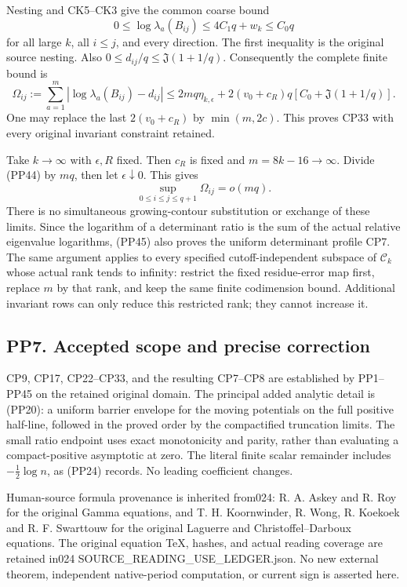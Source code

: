 \documentclass[10pt]{article}
\begin{document}
Nesting and CK5--CK3 give the common coarse bound \[
0\le\log\lambda_a(B_{ij})\le4C_1q+w_k\le C_0q
\tag{PP43}
\] for all large \(k\), all \(i\le j\), and every direction. The first inequality is the original source nesting. Also \(0\le d_{ij}/q\le\mathfrak J(1+1/q)\). Consequently the complete finite bound is \[
\boxed{
\Omega_{ij}:=\sum_{a=1}^m|\log\lambda_a(B_{ij})-d_{ij}|
\le2mq\eta_{k,\epsilon}
+2(v_0+c_R)q[C_0+\mathfrak J(1+1/q)].
}
\tag{PP44}
\] One may replace the last \(2(v_0+c_R)\) by \(\min(m,2c)\). This proves CP33 with every original invariant constraint retained.

Take \(k\to\infty\) with \(\epsilon,R\) fixed. Then \(c_R\) is fixed and \(m=8k-16\to\infty\). Divide (PP44) by \(mq\), then let \(\epsilon\downarrow0\). This gives \[
\boxed{\sup_{0\le i\le j\le q+1}\Omega_{ij}=o(mq).}
\tag{PP45}
\] There is no simultaneous growing-contour substitution or exchange of these limits. Since the logarithm of a determinant ratio is the sum of the actual relative eigenvalue logarithms, (PP45) also proves the uniform determinant profile CP7. The same argument applies to every specified cutoff-independent subspace of \(\mathcal C_k\) whose actual rank tends to infinity: restrict the fixed residue-error map first, replace \(m\) by that rank, and keep the same finite codimension bound. Additional invariant rows can only reduce this restricted rank; they cannot increase it.

\subsection{PP7. Accepted scope and precise correction}\label{pp7.-accepted-scope-and-precise-correction}

CP9, CP17, CP22--CP33, and the resulting CP7--CP8 are established by PP1--PP45 on the retained original domain. The principal added analytic detail is (PP20): a uniform barrier envelope for the moving potentials on the full positive half-line, followed in the proved order by the compactified truncation limits. The small ratio endpoint uses exact monotonicity and parity, rather than evaluating a compact-positive asymptotic at zero. The literal finite scalar remainder includes \(-\tfrac12\log n\), as (PP24) records. No leading coefficient changes.

Human-source formula provenance is inherited from024: R. A. Askey and R. Roy for the original Gamma equations, and T. H. Koornwinder, R. Wong, R. Koekoek and R. F. Swarttouw for the original Laguerre and Christoffel--Darboux equations. The original equation TeX, hashes, and actual reading coverage are retained in024 SOURCE\_READING\_USE\_LEDGER.json. No new external theorem, independent native-period computation, or current sign is asserted here.
\end{document}
